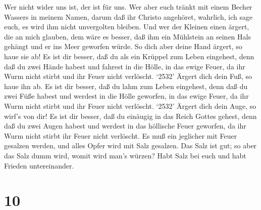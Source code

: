 Wer nicht wider uns ist, der ist für uns. 
Wer aber euch tränkt mit einem Becher Wassers in meinem Namen, darum daß
ihr Christo angehöret, wahrlich, ich sage euch, es wird ihm nicht
unvergolten bleiben.  Und wer der Kleinen einen ärgert, die
an mich glauben, dem wäre es besser, daß ihm ein Mühlstein an seinen
Hals gehängt und er ins Meer geworfen würde.  So dich aber
deine Hand ärgert, so haue sie ab! Es ist dir besser, daß du als ein
Krüppel zum Leben eingehest, denn daß du zwei Hände habest und fahrest
in die Hölle, in das ewige Feuer,  da ihr Wurm nicht stirbt
und ihr Feuer nicht verlöscht.  `2532' Ärgert dich dein
Fuß, so haue ihn ab. Es ist dir besser, daß du lahm zum Leben eingehest,
denn daß du zwei Füße habest und werdest in die Hölle geworfen, in das
ewige Feuer,  da ihr Wurm nicht stirbt und ihr Feuer nicht
verlöscht.  `2532' Ärgert dich dein Auge, so wirf's von
dir! Es ist dir besser, daß du einäugig in das Reich Gottes gehest, denn
daß du zwei Augen habest und werdest in das höllische Feuer geworfen,
 da ihr Wurm nicht stirbt ihr Feuer nicht verlöscht.
 Es muß ein jeglicher mit Feuer gesalzen werden, und alles
Opfer wird mit Salz gesalzen.  Das Salz ist gut; so aber
das Salz dumm wird, womit wird man's würzen? Habt Salz bei euch und habt
Frieden untereinander.

\hypertarget{section-9}{%
\section{10}\label{section-9}}

